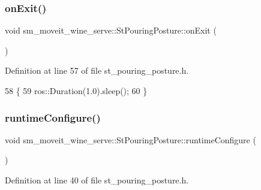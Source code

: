 \subsubsection{\texorpdfstring{on\+Exit()}{onExit()}}
{\footnotesize\ttfamily void sm\+\_\+moveit\+\_\+wine\+\_\+serve\+::\+St\+Pouring\+Posture\+::on\+Exit (\begin{DoxyParamCaption}{ }\end{DoxyParamCaption})\hspace{0.3cm}{\ttfamily [inline]}}



Definition at line 57 of file st\+\_\+pouring\+\_\+posture.\+h.


\begin{DoxyCode}
58         \{
59             ros::Duration(1.0).sleep();
60         \}
\end{DoxyCode}
\mbox{\label{structsm__moveit__wine__serve_1_1StPouringPosture_ab07b65aec9bed561342d78752fe79c31}} 
\subsubsection{\texorpdfstring{runtime\+Configure()}{runtimeConfigure()}}
{\footnotesize\ttfamily void sm\+\_\+moveit\+\_\+wine\+\_\+serve\+::\+St\+Pouring\+Posture\+::runtime\+Configure (\begin{DoxyParamCaption}{ }\end{DoxyParamCaption})\hspace{0.3cm}{\ttfamily [inline]}}



Definition at line 40 of file st\+\_\+pouring\+\_\+posture.\+h.


